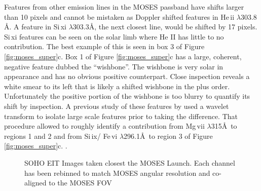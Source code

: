 \documentclass[]{solarphysics}
\begin{document}
\begin{article}
	
	Features from other emission lines in the MOSES passband have shifts larger than 10 pixels and cannot be mistaken as Doppler shifted features in He\,{\sc ii}  $\lambda303.8$ \AA. A feature in Si\,{\sc xi} $\lambda$303.3\AA , the next closest line, would be shifted by 17 pixels. Si\,{\sc xi} features can be seen on the solar limb where He II has little to no contribution. The best example of this is seen in box 3 of Figure \ref{fig:moses_super}c.  Box 1 of Figure \ref{fig:moses_super}c has a large, coherent, negative feature dubbed the ``wishbone''.  The wishbone is very solar in appearance and has no obvious positive counterpart.  Close inspection reveals a white smear to its left that is likely a shifted wishbone in the plus order.  Unfortunately the positive portion of the wishbone is too blurry to quantify its shift by inspection. A previous study of these features by \citet{Rust2017} used a wavelet transform to isolate large scale features prior to taking the difference.  That procedure allowed \citet{Rust2017} to roughly identify a contribution from Mg\,{\sc vii} $\lambda$315\AA \  to regions 1 and 2 and from Si\,{\sc ix}/ Fe\,{\sc vi} $\lambda$296.1\AA \ to region 3 of Figure \ref{fig:moses_super}c.
.	
	\begin{figure}
		
			
		

		
		
		\caption{SOHO EIT Images taken closest the MOSES Launch.  Each channel has been rebinned to match MOSES angular resolution and co-aligned to the MOSES FOV}
		\label{fig:EIT}
	\end{figure}


\end{article}
\end{document}

